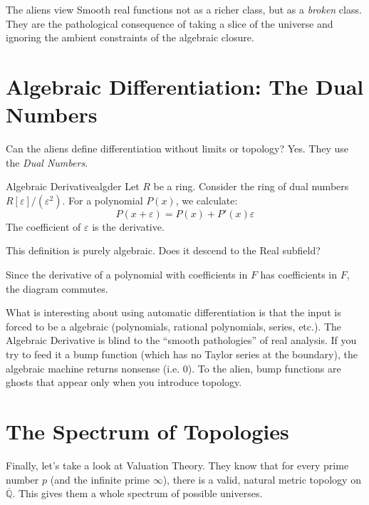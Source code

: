 \documentclass{article}
\newcommand{\Q}{{\mathbb{Q}}}
\newcommand{\oln}[1]{{\overline{#1}}}
\begin{document}
The aliens view Smooth real functions not as a richer class, but as a \emph{broken} class. They are the pathological consequence of taking a slice of the universe and ignoring the ambient constraints of the algebraic closure.

\section{Algebraic Differentiation: The Dual Numbers}

Can the aliens define differentiation without limits or topology? Yes. They use the \emph{Dual Numbers}.

\begin{defn}{Algebraic Derivative}{algder}
    Let $R$ be a ring. Consider the ring of dual numbers $R[\varepsilon]/(\varepsilon^2)$. For a polynomial $P(x)$, we calculate:
    \[ P(x + \varepsilon) = P(x) + P'(x)\varepsilon \]
    The coefficient of $\varepsilon$ is the derivative.
\end{defn}

This definition is purely algebraic. Does it descend to the Real subfield?

\begin{center}
\end{center}

Since the derivative of a polynomial with coefficients in $F$ has coefficients in $F$, the diagram commutes.

What is interesting about using automatic differentiation is that the input is forced to be a algebraic
(polynomials, rational polynomials, series, etc.). The Algebraic Derivative is blind to the ``smooth
pathologies'' of real analysis. If you try to feed it a bump function (which has no Taylor series at the
boundary), the algebraic machine returns nonsense (i.e. $0$). To the alien, bump functions are ghosts that appear only when you
introduce topology.

\section{The Spectrum of Topologies}

Finally, let's take a look at Valuation Theory. They know that for every prime number $p$ (and the infinite
prime $\infty$), there is a valid, natural metric topology on $\oln{\Q}$. This gives them a whole spectrum of
possible universes.
\end{document}
